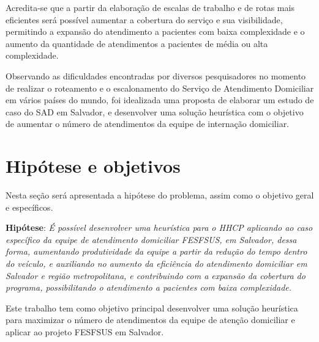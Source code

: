 Acredita-se que a partir da elaboração de escalas de trabalho e de rotas mais eficientes será possível aumentar a cobertura do serviço e sua visibilidade, permitindo a expansão do atendimento a pacientes com baixa complexidade e o aumento da quantidade de atendimentos a pacientes de média ou alta complexidade.  

Observando as dificuldades encontradas por diversos pesquisadores no momento de realizar o roteamento e o escalonamento do Serviço de Atendimento Domiciliar em vários países do mundo, foi idealizada uma proposta de elaborar um estudo de caso do \ac{SAD} em Salvador, e desenvolver uma solução heurística com o objetivo de aumentar o número de atendimentos da equipe de internação domiciliar. 


\section{Hipótese e objetivos}

Nesta seção será apresentada a hipótese do problema, assim como o objetivo geral e específicos.

\textbf{Hipótese}: \emph{É possível desenvolver uma heurística para o \ac{HHCP} aplicando ao caso específico da equipe de atendimento domiciliar FESFSUS, em Salvador, dessa forma, aumentando produtividade da equipe a partir da redução do tempo dentro do veículo, e auxiliando no aumento da eficiência do atendimento domiciliar em Salvador e região metropolitana,  e contribuindo com a expansão da cobertura do programa, possibilitando o atendimento a pacientes com baixa complexidade.}

Este trabalho tem como objetivo principal desenvolver uma solução heurística para maximizar o número de atendimentos da equipe de atenção domiciliar e aplicar ao projeto FESFSUS em Salvador. 

